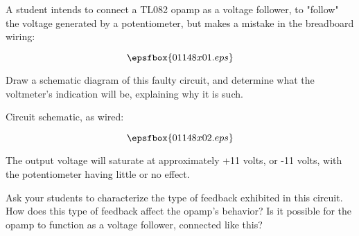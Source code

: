

A student intends to connect a TL082 opamp as a voltage follower, to "follow" the voltage generated by a potentiometer, but makes a mistake in the breadboard wiring:

$$\epsfbox{01148x01.eps}$$

Draw a schematic diagram of this faulty circuit, and determine what the voltmeter's indication will be, explaining why it is such.







Circuit schematic, as wired:

$$\epsfbox{01148x02.eps}$$

The output voltage will saturate at approximately +11 volts, or -11 volts, with the potentiometer having little or no effect.







Ask your students to characterize the type of feedback exhibited in this circuit.  How does this type of feedback affect the opamp's behavior?  Is it possible for the opamp to function as a voltage follower, connected like this?



